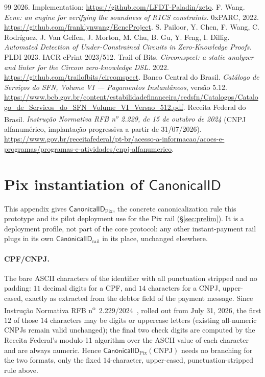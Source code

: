 \documentclass[11pt]{article}
\begin{document}
\begin{thebibliography}{99}
2026. Implementation: \url{https://github.com/LFDT-Paladin/zeto}.
 F. Wang. \emph{Ecne: an engine for verifying the soundness of
R1CS constraints.} 0xPARC, 2022. \url{https://github.com/franklynwang/EcneProject}.
 S. Pailoor, Y. Chen, F. Wang, C. Rodr\'iguez, J. Van Geffen,
J. Morton, M. Chu, B. Gu, Y. Feng, I. Dillig. \emph{Automated Detection of
Under-Constrained Circuits in Zero-Knowledge Proofs.} PLDI 2023. IACR ePrint
2023/512.
 Trail of Bits. \emph{Circomspect: a static analyzer and
linter for the Circom zero-knowledge DSL.} 2022.
\url{https://github.com/trailofbits/circomspect}.
 Banco Central do Brasil. \emph{Cat\'alogo de Servi\c{c}os do
SFN, Volume VI --- Pagamentos Instant\^aneos}, vers\~ao 5.12.
\url{https://www.bcb.gov.br/content/estabilidadefinanceira/cedsfn/Catalogos/Catalogo_de_Servicos_do_SFN_Volume_VI_Versao_512.pdf}.
 Receita Federal do Brasil. \emph{Instru\c{c}\~ao Normativa RFB
n\textsuperscript{o} 2.229, de 15 de outubro de 2024} (CNPJ alfanum\'erico,
implanta\c{c}\~ao progressiva a partir de 31/07/2026).
\url{https://www.gov.br/receitafederal/pt-br/acesso-a-informacao/acoes-e-programas/programas-e-atividades/cnpj-alfanumerico}.
\end{thebibliography}

\appendix
\section{Pix instantiation of \texorpdfstring{$\mathsf{CanonicalID}$}{CanonicalID}}
\label{app:pix}
This appendix gives $\mathsf{CanonicalID}_{\text{Pix}}$, the concrete
canonicalization rule this prototype and its pilot deployment use for the Pix
rail (\S\ref{sec:prelim}). It is a deployment profile, not part of the core
protocol: any other instant-payment rail plugs in its own
$\mathsf{CanonicalID}_{\text{rail}}$ in its place, unchanged elsewhere.

\paragraph{CPF/CNPJ.} The bare ASCII characters of the identifier with all
punctuation stripped and no padding: $11$ decimal digits for a CPF, and $14$
characters for a CNPJ, upper-cased, exactly as extracted from the debtor field
of the payment message. Since Instru\c{c}\~ao Normativa RFB
n\textsuperscript{o}~2.229/2024~\cite{cnpjalfa}, rolled out from July 31, 2026,
the first $12$ of those $14$ characters may be digits or uppercase letters
(existing all-numeric CNPJs remain valid unchanged); the final two check
digits are computed by the Receita Federal's modulo-11 algorithm over the
ASCII value of each character and are always numeric. Hence
$\mathsf{CanonicalID}_{\text{Pix}}(\text{CNPJ})$ needs no branching for the two
formats, only the fixed $14$-character, upper-cased, punctuation-stripped rule
above.
\end{document}
